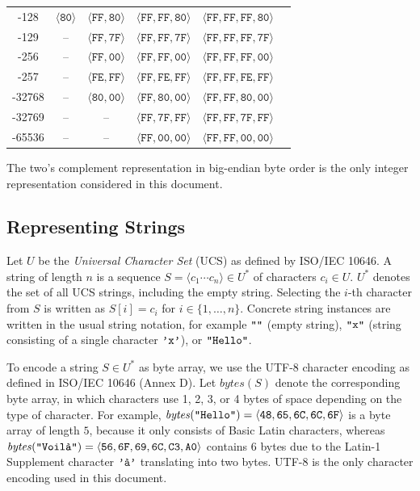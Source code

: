 \documentclass[bibtotoc,halfparskip,oneside]{scrreprt}
\newcommand{\hex}[1]{\ensuremath{\mathtt{#1}}}
\newcommand{\str}[1]{\ensuremath{\text{\texttt{"#1"}}}}
\newcommand{\chr}[1]{\ensuremath{\text{\texttt{'#1'}}}}
\begin{document}
\begin{center}
\begin{tabular}{c|ccccc}
    -128   & $\langle\hex{80}\rangle$ & $\langle\hex{FF},\hex{80}\rangle$ & $\langle\hex{FF},\hex{FF},\hex{80}\rangle$ & $\langle\hex{FF},\hex{FF},\hex{FF},\hex{80}\rangle$\\
    -129   & -- & $\langle\hex{FF},\hex{7F}\rangle$ & $\langle\hex{FF},\hex{FF},\hex{7F}\rangle$ & $\langle\hex{FF},\hex{FF},\hex{FF},\hex{7F}\rangle$\\
    -256   & -- & $\langle\hex{FF},\hex{00}\rangle$ & $\langle\hex{FF},\hex{FF},\hex{00}\rangle$ & $\langle\hex{FF},\hex{FF},\hex{FF},\hex{00}\rangle$\\
    -257   & -- & $\langle\hex{FE},\hex{FF}\rangle$ & $\langle\hex{FF},\hex{FE},\hex{FF}\rangle$ & $\langle\hex{FF},\hex{FF},\hex{FE},\hex{FF}\rangle$\\
    -32768 & -- & $\langle\hex{80},\hex{00}\rangle$ & $\langle\hex{FF},\hex{80},\hex{00}\rangle$ & $\langle\hex{FF},\hex{FF},\hex{80},\hex{00}\rangle$\\
    -32769 & -- & -- & $\langle\hex{FF},\hex{7F},\hex{FF}\rangle$ & $\langle\hex{FF},\hex{FF},\hex{7F},\hex{FF}\rangle$\\
    -65536 & -- & -- & $\langle\hex{FF},\hex{00},\hex{00}\rangle$ & $\langle\hex{FF},\hex{FF},\hex{00},\hex{00}\rangle$\\
\end{tabular} 
\end{center}
The two's complement representation in big-endian byte order is the only integer representation considered in this document. 

\subsection{Representing Strings}

Let $U$ be the \emph{Universal Character Set} (UCS) as defined by ISO/IEC 10646. A string of length $n$ is a sequence $S=\langle c_1\cdots c_{n}\rangle\in U^*$ of characters $c_i\in U$. $U^*$ denotes the set of all UCS strings, including the empty string. Selecting the $i$-th character from $S$ is written as $S[i]=c_i$ for $i\in\{1,\ldots,n\}$. Concrete string instances are written in the usual string notation, for example $\str{}$ (empty string), $\str{x}$ (string consisting of a single character $\chr{x}$), or $\str{Hello}$.

To encode a string $S\in U^*$ as byte array, we use the UTF-8 character encoding as defined in ISO/IEC 10646 (Annex D). Let $\mathit{bytes}(S)$ denote the corresponding byte array, in which characters use 1, 2, 3, or 4 bytes of space depending on the type of character. For example, $\mathit{bytes}(\str{Hello})=\langle\hex{48},\hex{65},\hex{6C},\hex{6C},\hex{6F}\rangle$ is a byte array of length $5$, because it only consists of Basic Latin characters, whereas $\mathit{bytes}(\str{Voilà})=\langle\hex{56},\hex{6F},\hex{69},\hex{6C},\hex{C3},\hex{A0}\rangle$ contains $6$ bytes due to the Latin-1 Supplement character $\chr{à}$ translating into two bytes. UTF-8 is the only character encoding used in this document.
\end{document}
